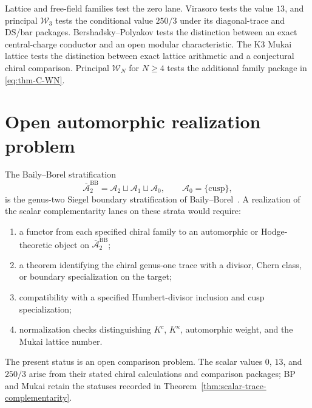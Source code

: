 \begin{remark}
\label{rem:theorem-C-test-families}
Lattice and free-field families test the zero lane.  Virasoro tests
the value \(13\), and principal \(\mathcal W_3\) tests the conditional
value \(250/3\) under its diagonal-trace and DS/bar packages.
Bershadsky--Polyakov tests the distinction between an exact
central-charge conductor and an open modular characteristic.  The K3
Mukai lattice tests the distinction between exact lattice arithmetic
and a conjectural chiral comparison.  Principal \(\mathcal W_N\) for
\(N\ge4\) tests the additional family package in
\eqref{eq:thm-C-WN}.
\end{remark}

\section{Open automorphic realization problem}
\label{sec:complementarity-baily-borel}

\begin{remark}
\label{rem:cct-baily-borel}
The Baily--Borel stratification
\[
 \overline{\mathcal A}_2^{\mathrm{BB}}
 =
 \mathcal A_2\sqcup\mathcal A_1\sqcup\mathcal A_0,
 \qquad \mathcal A_0=\{\mathrm{cusp}\},
\]
is the genus-two Siegel boundary stratification of
Baily--Borel~\cite{BailyBorel66}.  A realization of the scalar
complementarity lanes on these strata would require:
\begin{enumerate}[label=\textup{(\roman*)}]
\item a functor from each specified chiral family to an automorphic
 or Hodge-theoretic object on \(\overline{\mathcal A}_2^{\mathrm{BB}}\);
\item a theorem identifying the chiral genus-one trace with a divisor,
 Chern class, or boundary specialization on the target;
\item compatibility with a specified Humbert-divisor inclusion and cusp
 specialization;
\item normalization checks distinguishing \(K^c\), \(K^\kappa\),
 automorphic weight, and the Mukai lattice number.
\end{enumerate}
The present status is an open comparison problem.  The scalar values
\(0\), \(13\), and \(250/3\) arise from their stated chiral
calculations and comparison packages; BP and Mukai retain the statuses recorded in
Theorem~\ref{thm:scalar-trace-complementarity}.
\end{remark}
